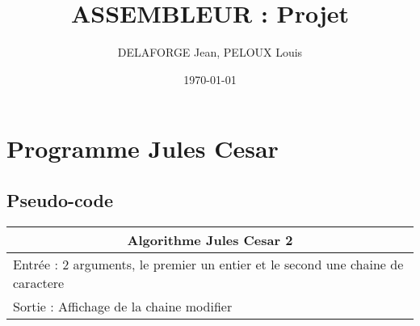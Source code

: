 \documentclass[a4paper, 12pt]{article}
\title{ASSEMBLEUR : Projet}
\author{DELAFORGE Jean, PELOUX Louis}
\date{\today}
\begin{document}
\maketitle

\newpage

\tableofcontents

\newpage




\section{Programme Jules Cesar}

\subsection{Pseudo-code}

\begin{center}
  \begin{tabular}{|l|}
    \hline
    \multicolumn{1}{|c|}{ Algorithme Jules Cesar 2} \\
    \hline
    Entrée : 2 arguments, le premier un entier et le second une chaine de caractere  \\
    \hline
    Sortie : Affichage de la chaine modifier \\
    \hline
  \end{tabular}
\end{center}
\end{document}
